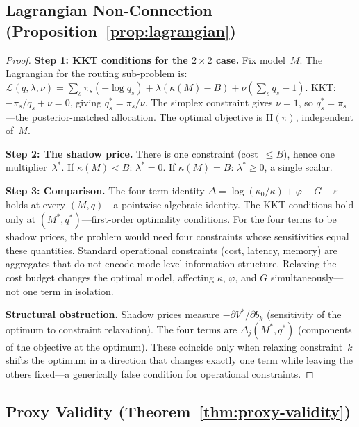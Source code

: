 \documentclass[twoside,11pt]{article}
\newcommand{\Hent}{\mathrm{H}}
\newcommand{\mismatch}{\varepsilon}
\begin{document}
\subsection{Lagrangian Non-Connection (Proposition~\ref{prop:lagrangian})}
\label{app:lagrangian}

\begin{proof}
\noindent\textbf{Step 1: KKT conditions for the $2 \times 2$ case.}
Fix model~$M$.
The Lagrangian for the routing sub-problem is:
$\mathcal{L}(q,\lambda,\nu) = \sum_s \pi_s(-\log q_s) + \lambda(\kappa(M)-B) + \nu(\sum_s q_s - 1)$.
KKT: $-\pi_s/q_s + \nu = 0$, giving $q_s^* = \pi_s/\nu$.
The simplex constraint gives $\nu = 1$, so $q_s^* = \pi_s$---the posterior-matched allocation.
The optimal objective is $\Hent(\pi)$, independent of~$M$.

\noindent\textbf{Step 2: The shadow price.}
There is one constraint (cost~$\le B$), hence one multiplier~$\lambda^*$.
If $\kappa(M) < B$: $\lambda^* = 0$.
If $\kappa(M) = B$: $\lambda^* \ge 0$, a single scalar.

\noindent\textbf{Step 3: Comparison.}
The four-term identity $\Delta = \log(\kappa_0/\kappa) + \varphi + G - \mismatch$ holds at every $(M,q)$---a pointwise algebraic identity.
The KKT conditions hold only at $(M^*,q^*)$---first-order optimality conditions.
For the four terms to be shadow prices, the problem would need four constraints whose sensitivities equal these quantities.
Standard operational constraints (cost, latency, memory) are aggregates that do not encode mode-level information structure.
Relaxing the cost budget changes the optimal model, affecting $\kappa$, $\varphi$, and $G$ simultaneously---not one term in isolation.

\noindent\textbf{Structural obstruction.}
Shadow prices measure $-\partial V^*/\partial b_k$ (sensitivity of the optimum to constraint relaxation).
The four terms are $\Delta_j(M^*,q^*)$ (components of the objective at the optimum).
These coincide only when relaxing constraint~$k$ shifts the optimum in a direction that changes exactly one term while leaving the others fixed---a generically false condition for operational constraints.
\end{proof}

\subsection{Proxy Validity (Theorem~\ref{thm:proxy-validity})}
\label{app:proxy}
\end{document}
